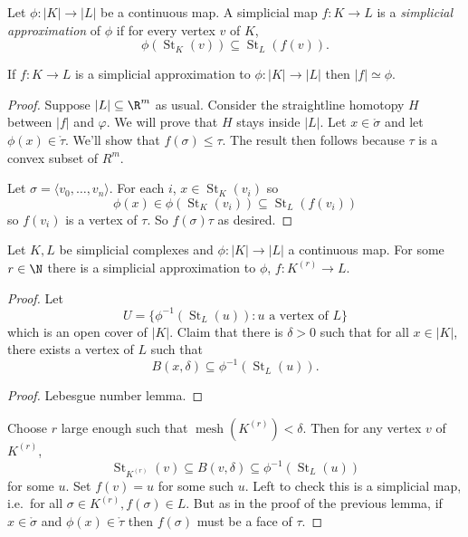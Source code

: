 \documentclass[a4paper]{article}
\newcommand{\interior}{\mathring} %
\DeclareMathOperator{\mesh}{mesh}
\DeclareMathOperator{\St}{St} %
\begin{document}
\begin{definition}
  Let \(\phi: |K| \to |L|\) be a continuous map. A simplicial map \(f: K \to L\) is a \emph{simplicial approximation} of \(\phi\) if for every vertex \(v\) of \(K\),
  \[
    \phi(\St_K(v)) \subseteq \St_L(f(v)).
  \]
\end{definition}

\begin{lemma}
  If \(f: K \to L\) is a simplicial approximation to \(\phi: |K| \to |L|\) then \(|f| \simeq \phi\).
\end{lemma}

\begin{proof}
  Suppose \(|L| \subseteq \R^m\) as usual. Consider the straightline homotopy \(H\) between \(|f|\) and \(\varphi\). We will prove that \(H\) stays inside \(|L|\). Let \(x \in \interior \sigma\) and let \(\phi(x) \in \interior \tau\). We'll show that \(f(\sigma) \leq \tau\). The result then follows because \(\tau\) is a convex subset of \(R^m\).

  Let \(\sigma = \langle v_0, \dots, v_n \rangle\). For each \(i\), \(x \in \St_K(v_i)\) so
  \[
    \phi(x) \in \phi(\St_K(v_i)) \subseteq \St_L(f(v_i))
  \]
  so \(f(v_i)\) is a vertex of \(\tau\). So \(f(\sigma) \tau\) as desired.
\end{proof}

\begin{theorem}
  Let \(K, L\) be simplicial complexes and \(\phi: |K| \to |L|\) a continuous map. For some \(r \in \N\) there is a simplicial approximation to \(\phi\), \(f: K^{(r)} \to L\).
\end{theorem}

\begin{proof}
  Let
  \[
    U = \{\phi^{-1}(\St_L(u)): u \text{ a vertex of } L\}
  \]
  which is an open cover of \(|K|\). Claim that there is \(\delta > 0\) such that for all \(x \in |K|\), there exists a vertex of \(L\) such that
  \[
    B(x, \delta) \subseteq \phi^{-1}(\St_L(u)).
  \]

  \begin{proof}
    Lebesgue number lemma.
  \end{proof}
  Choose \(r\) large enough such that \(\mesh(K^{(r)}) < \delta\). Then for any vertex \(v\) of \(K^{(r)}\),
  \[
    \St_{K^{(r)}}(v) \subseteq B(v, \delta) \subseteq \phi^{-1}(\St_L(u))
  \]
  for some \(u\). Set \(f(v) = u\) for some such \(u\). Left to check this is a simplicial map, i.e.\ for all \(\sigma \in K^{(r)}, f(\sigma) \in L\). But as in the proof of the previous lemma, if \(x \in \interior \sigma\) and \(\phi(x) \in \interior \tau\) then \(f(\sigma)\) must be a face of \(\tau\).
\end{proof}
\end{document}
